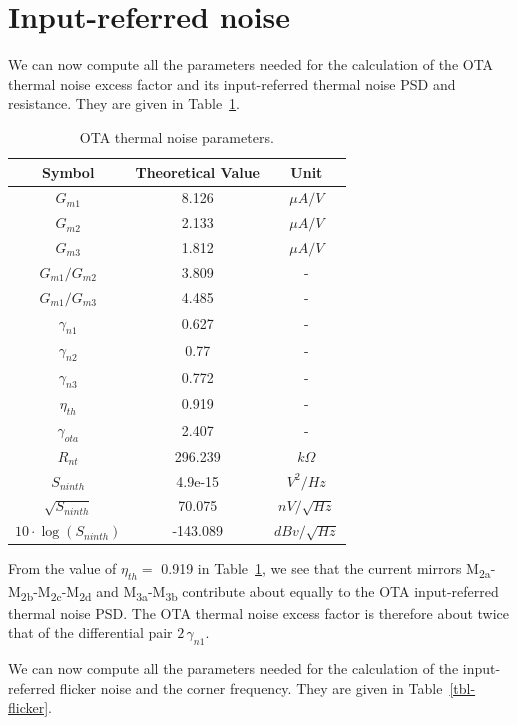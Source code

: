\documentclass[
  a4paper,
  DIV=11,
  numbers=noendperiod]{scrreprt}
\begin{document}
\section{Input-referred noise}\label{input-referred-noise}

We can now compute all the parameters needed for the calculation of the
OTA thermal noise excess factor and its input-referred thermal noise PSD
and resistance. They are given in Table~\ref{tbl-thermal}.

\begin{longtable}[]{@{}ccc@{}}

\caption{\label{tbl-thermal}OTA thermal noise parameters.}

\tabularnewline

\toprule\noalign{}
Symbol & Theoretical Value & Unit \\
\midrule\noalign{}
\endhead
\bottomrule\noalign{}
\endlastfoot
\(G_{m1}\) & 8.126 & \(\mu A/V\) \\
\(G_{m2}\) & 2.133 & \(\mu A/V\) \\
\(G_{m3}\) & 1.812 & \(\mu A/V\) \\
\(G_{m1}/G_{m2}\) & 3.809 & - \\
\(G_{m1}/G_{m3}\) & 4.485 & - \\
\(\gamma_{n1}\) & 0.627 & - \\
\(\gamma_{n2}\) & 0.77 & - \\
\(\gamma_{n3}\) & 0.772 & - \\
\(\eta_{th}\) & 0.919 & - \\
\(\gamma_{ota}\) & 2.407 & - \\
\(R_{nt}\) & 296.239 & \(k \Omega\) \\
\(S_{ninth}\) & 4.9e-15 & \(V^2/Hz\) \\
\(\sqrt{S_{ninth}}\) & 70.075 & \(nV/\sqrt{Hz}\) \\
\(10 \cdot \log(S_{ninth})\) & -143.089 & \(dBv/\sqrt{Hz}\) \\

\end{longtable}

From the value of \(\eta_{th} =\) 0.919 in Table~\ref{tbl-thermal}, we
see that the current mirrors
M\textsubscript{2a}-M\textsubscript{2b}-M\textsubscript{2c}-M\textsubscript{2d}
and M\textsubscript{3a}-M\textsubscript{3b} contribute about equally to
the OTA input-referred thermal noise PSD. The OTA thermal noise excess
factor is therefore about twice that of the differential pair
\(2\,\gamma_{n1}\).

We can now compute all the parameters needed for the calculation of the
input-referred flicker noise and the corner frequency. They are given in
Table~\ref{tbl-flicker}.
\end{document}
